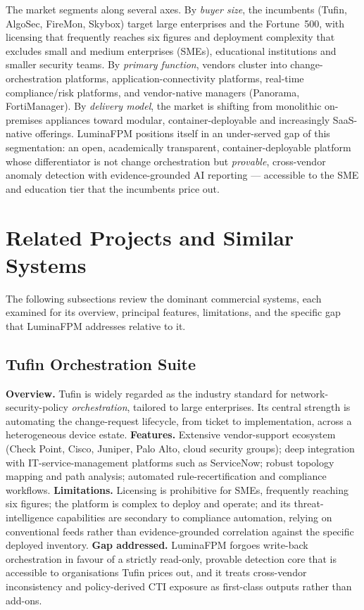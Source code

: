 \documentclass[12pt,a4paper]{report}
\renewcommand{\_}{\textunderscore\allowbreak}
\begin{document}
The market segments along several axes. By \emph{buyer size}, the incumbents (Tufin, AlgoSec, FireMon, Skybox) target large enterprises and the Fortune~500, with licensing that frequently reaches six figures and deployment complexity that excludes small and medium enterprises (SMEs), educational institutions and smaller security teams. By \emph{primary function}, vendors cluster into change-orchestration platforms, application-connectivity platforms, real-time compliance/risk platforms, and vendor-native managers (Panorama, FortiManager). By \emph{delivery model}, the market is shifting from monolithic on-premises appliances toward modular, container-deployable and increasingly SaaS-native offerings. LuminaFPM positions itself in an under-served gap of this segmentation: an open, academically transparent, container-deployable platform whose differentiator is not change orchestration but \emph{provable}, cross-vendor anomaly detection with evidence-grounded AI reporting --- accessible to the SME and education tier that the incumbents price out.

\section{Related Projects and Similar Systems}
\label{sec:ch2-related}
The following subsections review the dominant commercial systems, each examined for its overview, principal features, limitations, and the specific gap that LuminaFPM addresses relative to it.

\subsection{Tufin Orchestration Suite}
\textbf{Overview.} Tufin is widely regarded as the industry standard for network-security-policy \emph{orchestration}, tailored to large enterprises. Its central strength is automating the change-request lifecycle, from ticket to implementation, across a heterogeneous device estate.
\textbf{Features.} Extensive vendor-support ecosystem (Check Point, Cisco, Juniper, Palo Alto, cloud security groups); deep integration with IT-service-management platforms such as ServiceNow; robust topology mapping and path analysis; automated rule-recertification and compliance workflows.
\textbf{Limitations.} Licensing is prohibitive for SMEs, frequently reaching six figures; the platform is complex to deploy and operate; and its threat-intelligence capabilities are secondary to compliance automation, relying on conventional feeds rather than evidence-grounded correlation against the specific deployed inventory.
\textbf{Gap addressed.} LuminaFPM forgoes write-back orchestration in favour of a strictly read-only, provable detection core that is accessible to organisations Tufin prices out, and it treats cross-vendor inconsistency and policy-derived CTI exposure as first-class outputs rather than add-ons.
\end{document}
